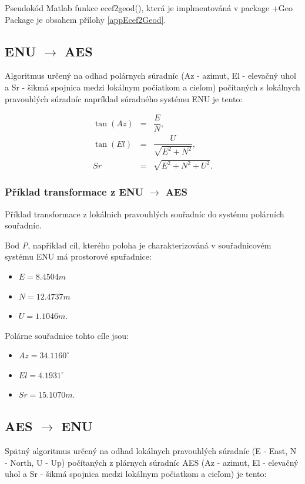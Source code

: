 Pseudokód Matlab funkce ecef2geod(), která je implmentováná v package +Geo Package je obsahem přílohy \ref{appEcef2Geod}.

\subsection{ENU $\rightarrow$ AES}

Algoritmus určený na odhad polárnych súradníc (Az - azimut, El - elevačný uhol a Sr - šikmá spojnica medzi lokálnym počiatkom a cieľom) počítaných s lokálnych pravouhlých súradníc napríklad súradného systému ENU je tento:

\begin{eqnarray}
\tan\left(Az\right) &=& \dfrac{E}{N}, \\
\tan\left(El\right) &=& \dfrac{U}{\sqrt{E^{2} + N^{2}}}, \\
Sr &=& \sqrt{E^2 + N^2 + U^2}.
\end{eqnarray}

\subsubsection{Příklad transformace z ENU $\rightarrow$ AES}

Příklad transformace z lokálnich pravouhlých souřadníc do systému polárních souřadníc.

Bod \textit{P}, například cíl, kterého poloha je charakterizováná v souřadnicovém systému ENU má prostorové  spuřadnice:
\begin{itemize}
\item $E = 8.4504 m$
\item $N = 12.4737 m$
\item $U = 1.1046 m.$
\end{itemize}

Polárne souřadnice tohto cíle jsou:
\begin{itemize}
\item $Az = 34.1160^{\circ}$
\item $El = 4.1931^{\circ}$
\item $Sr = 15.1070 m.$
\end{itemize}

\subsection{AES $\rightarrow$ ENU}

Spätný algoritmus určený na odhad lokálnych pravouhlých súradníc (E - East, N - North, U - Up) počítaných z plárnych súradníc AES (Az - azimut, El - elevačný uhol a Sr - šikmá spojnica medzi lokálnym počiatkom a cieľom) je tento:

